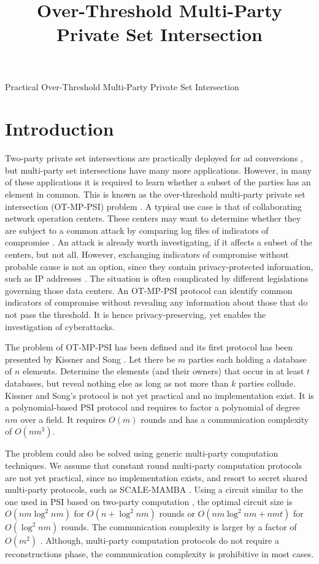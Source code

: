 \documentclass[10pt, sigconf]{acmart}
\title{Over-Threshold Multi-Party Private Set Intersection}
\date{}
\begin{document}
\pagestyle{plain} %
\onecolumn
\begingroup
\centering
{\Huge Practical Over-Threshold Multi-Party Private Set Intersection}\\[3em]
\endgroup

\section{Introduction}

Two-party private set intersections are practically deployed for ad conversions \cite{}, but multi-party set intersections have many more applications.
However, in many of these applications it is required to learn whether a subset of the parties has an element in common.
This is known as the over-threshold multi-party private set intersection (OT-MP-PSI) problem \cite{}.
A typical use case is that of collaborating network operation centers.
These centers may want to determine whether they are subject to a common attack by comparing log files of indicators of compromise \cite{}.
An attack is already worth investigating, if it affects a subset of the centers, but not all.
However, exchanging indicators of compromise without probable cause is not an option, since they contain privacy-protected information, such as IP addresses \cite{}.
The situation is often complicated by different legislations governing those data centers.
An OT-MP-PSI protocol can identify common indicators of compromise without revealing any information about those that do not pass the threshold.
It is hence privacy-preserving, yet enables the investigation of cyberattacks.

The problem of OT-MP-PSI has been defined and its first protocol has been presented by Kissner and Song \cite{}.
Let there be $m$ parties each holding a database of $n$ elements.
Determine the elements (and their owners) that occur in at least $t$ databases, but reveal nothing else as long as not more than $k$ parties collude.
Kissner and Song's protocol is not yet practical and no implementation exist.
It is a polynomial-based PSI protocol and requires to factor a polynomial of degree $nm$ over a field.
It requires $O(m)$ rounds and has a communication complexity of $O(nm^3)$.

The problem could also be solved using generic multi-party computation techniques.
We assume that constant round multi-party computation protocols \cite{} are not yet practical, since no implementation exists, and resort to secret shared multi-party protocols, such as SCALE-MAMBA \cite{}.
Using a circuit similar to the one used in PSI based on two-party computation \cite{}, the optimal circuit size is $O(nm \log^2 nm)$ for $O(n + \log^2 nm)$ rounds or $O(nm \log^2 nm + nmt)$ for $O(\log^2 nm)$ rounds.
The communication complexity is larger by a factor of $O(m^2)$ \cite{}.
Although, multi-party computation protocols do not require a reconstructions phase, the communication complexity is prohibitive in most cases.
\end{document}
